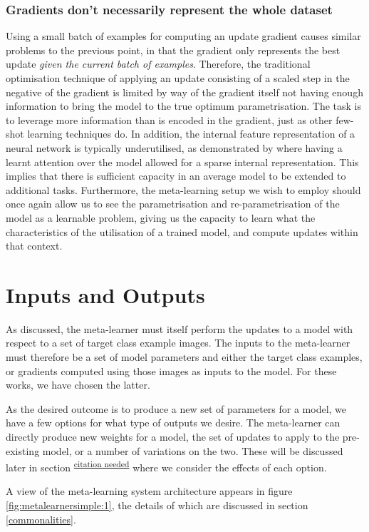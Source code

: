 \documentclass{report}
\newcommand{\TOCITE}[2][citation needed]{\textsuperscript{\underline{#1}}}
\begin{document}
\subsubsection{Gradients don't necessarily represent the whole dataset}
Using a small batch of examples for computing an update gradient causes similar problems to the previous point, in that the gradient only represents the best update \textit{given the current batch of examples}. Therefore, the traditional optimisation technique of applying an update consisting of a scaled step in the negative of the gradient is limited by way of the gradient itself not having enough information to bring the model to the true optimum parametrisation. The task is to leverage more information than is encoded in the gradient, just as other few-shot learning techniques do. In addition, the internal feature representation of a neural network is typically underutilised, as demonstrated by \parencite{hat} where having a learnt attention over the model allowed for a sparse internal representation. This implies that there is sufficient capacity in an average model to be extended to additional tasks. Furthermore, the meta-learning setup we wish to employ should once again allow us to see the parametrisation and re-parametrisation of the model as a learnable problem, giving us the capacity to learn what the characteristics of the utilisation of a trained model, and compute updates within that context. \par

\section{Inputs and Outputs}
As discussed, the meta-learner must itself perform the updates to a model with respect to a set of target class example images. The inputs to the meta-learner must therefore be a set of model parameters and either the target class examples, or gradients computed using those images as inputs to the model. For these works, we have chosen the latter. \par
As the desired outcome is to produce a new set of parameters for a model, we have a few options for what type of outputs we desire. The meta-learner can directly produce new weights for a model, the set of updates to apply to the pre-existing model, or a number of variations on the two. These will be discussed later in section \TOCITE{} where we consider the effects of each option. \par
A  view of the meta-learning system architecture appears in figure \ref{fig:metalearnersimple:1}, the details of which are discussed in section \ref{commonalities}.
\end{document}
